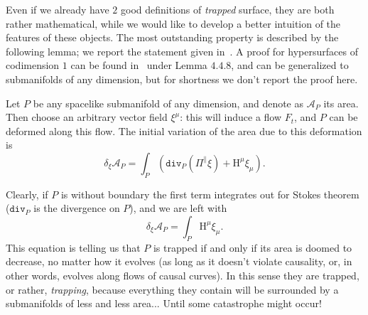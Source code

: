 Even if we already have \(2\) good definitions of \emph{trapped} surface, they are both rather mathematical, while we would like to develop a better intuition of the features of these objects. The most outstanding property is described by the following lemma; we report the statement given in~\cite{senovilla2022critical}. A proof for hypersurfaces of codimension \(1\) can be found in~\cite{kriele1999spacetime} under Lemma \(4.4.8\), and can be generalized to submanifolds of any dimension, but for shortness we don't report the proof here.
\begin{lemma}
	\label{lemma:variation-area}
	Let \(P\) be any spacelike submanifold of any dimension, and denote as \(\mathcal{A}_P\) its area. Then choose an arbitrary vector field \(\xi^{\mu}\): this will induce a flow \(F_t\), and \(P\) can be deformed along this flow. The initial variation of the area due to this deformation is
	\[
	\delta_{\xi}\mathcal{A}_P = \int_{P} \left(\texttt{div}_P (\Pi^{\parallel}\xi) + \mathrm{H}^{\mu}\xi_{\mu}\right).
	\]
\end{lemma}
 Clearly, if \(P\) is without boundary the first term integrates out for Stokes theorem (\(\texttt{div}_P\) is the divergence on \(P\)), and we are left with
 \begin{equation}
 	\label{eq:variation-area}
 	\delta_{\xi}\mathcal{A}_P = \int_{P} \mathrm{H}^{\mu}\xi_{\mu}.
 \end{equation}
	This equation is telling us that \(P\) is trapped if and only if its area is doomed to decrease, no matter how it evolves (as long as it doesn't violate causality, or, in other words, evolves along flows of causal curves). In this sense they are trapped, or rather, \emph{trapping}, because everything they contain will be surrounded by a submanifolds of less and less area... Until some catastrophe might occur!

